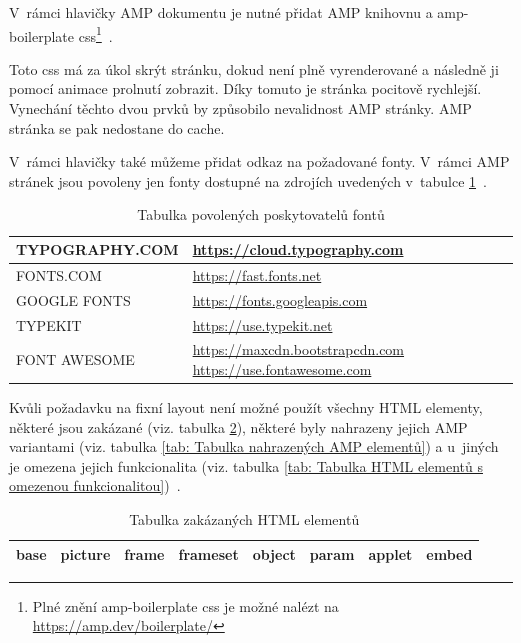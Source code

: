 V~rámci hlavičky AMP dokumentu je nutné přidat AMP knihovnu a amp-boilerplate css\footnote{Plné znění amp-boilerplate css je možné nalézt na \url{https://amp.dev/boilerplate/}}~\cite{AMPBoilerplate}.

Toto css má za úkol skrýt stránku, dokud není plně vyrenderované a následně ji pomocí animace prolnutí zobrazit. Díky tomuto je stránka pocitově rychlejší.
Vynechání těchto dvou prvků by způsobilo nevalidnost AMP stránky. AMP stránka se pak nedostane do cache.

V~rámci hlavičky také můžeme přidat odkaz na požadované fonty. V~rámci AMP stránek jsou povoleny jen fonty dostupné na zdrojích uvedených v~tabulce \ref{tab:Tabulka povolených zdrojů fontů}~\cite{ampCustomFonts}.

\begin{table}[H]
	\caption{Tabulka povolených poskytovatelů fontů}
	\centering
	\begin{tabular}{m{10em} | m{20em}}
		\toprule
		\cmidrule(r){1-2}
		TYPOGRAPHY.COM & \url{https://cloud.typography.com} \\ \midrule
		FONTS.COM & \url{https://fast.fonts.net} \\ \midrule
		GOOGLE FONTS & \url{https://fonts.googleapis.com} \\ \midrule
		TYPEKIT & \url{https://use.typekit.net} \\ \midrule
		FONT AWESOME & \url{https://maxcdn.bootstrapcdn.com} \newline \url{https://use.fontawesome.com} \\
		\bottomrule
	\end{tabular}
	\label{tab:Tabulka povolených zdrojů fontů}
\end{table}

Kvůli požadavku na fixní layout není možné použít všechny HTML elementy, některé jsou zakázané (viz. tabulka \ref{tab: Tabulka zakázaných HTML elementů}), některé byly nahrazeny jejich AMP variantami (viz. tabulka \ref{tab: Tabulka nahrazených AMP elementů}) a u~jiných je omezena jejich funkcionalita (viz. tabulka \ref{tab: Tabulka HTML elementů s omezenou funkcionalitou})~\cite[p.\ 41]{AMP-ENG-Book}.

\begin{table}[H]
	\caption{Tabulka zakázaných HTML elementů} 
	\centering
	\begin{tabular}{c|c|c|c|c|c|c|c}
		\toprule
		base & picture & frame & frameset & object & param & applet & embed \\
		\bottomrule
	\end{tabular}
	\label{tab: Tabulka zakázaných HTML elementů}
\end{table}

